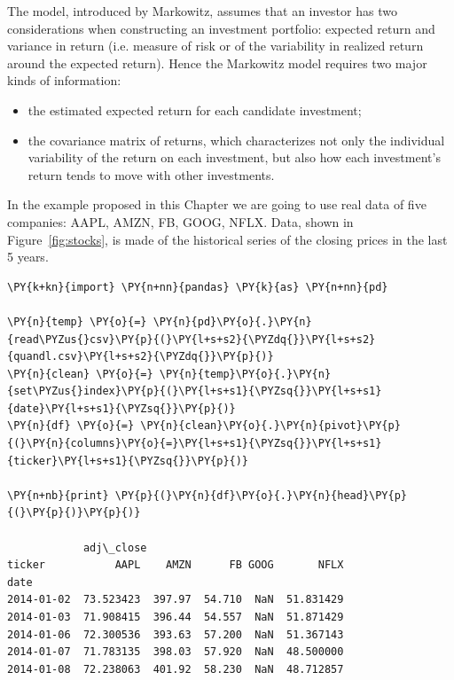 The model, introduced by Markowitz, assumes that an investor has
two considerations when constructing an investment portfolio: expected
return and variance in return (i.e. measure of risk or of the
variability in realized return around the expected return). Hence the
Markowitz model requires two major kinds of information:

\begin{itemize}
\tightlist
\item
  the estimated expected return for each candidate investment;
\item
  the covariance matrix of returns, which characterizes not only the 
  individual variability of the return on each investment, but also how each investment's return tends to move with other investments.
\end{itemize}

In the example proposed in this Chapter we are going to use real data
of five companies:  AAPL, AMZN, FB, GOOG, NFLX.
Data, shown in Figure~\ref{fig:stocks}, is made of the historical 
series of the closing prices in the last 5 years.

\begin{tcolorbox}[breakable, size=fbox, boxrule=1pt, pad at break*=1mm,colback=cellbackground, colframe=cellborder]
\begin{Verbatim}[commandchars=\\\{\}]
\PY{k+kn}{import} \PY{n+nn}{pandas} \PY{k}{as} \PY{n+nn}{pd}

\PY{n}{temp} \PY{o}{=} \PY{n}{pd}\PY{o}{.}\PY{n}{read\PYZus{}csv}\PY{p}{(}\PY{l+s+s2}{\PYZdq{}}\PY{l+s+s2}{quandl.csv}\PY{l+s+s2}{\PYZdq{}}\PY{p}{)}
\PY{n}{clean} \PY{o}{=} \PY{n}{temp}\PY{o}{.}\PY{n}{set\PYZus{}index}\PY{p}{(}\PY{l+s+s1}{\PYZsq{}}\PY{l+s+s1}{date}\PY{l+s+s1}{\PYZsq{}}\PY{p}{)}
\PY{n}{df} \PY{o}{=} \PY{n}{clean}\PY{o}{.}\PY{n}{pivot}\PY{p}{(}\PY{n}{columns}\PY{o}{=}\PY{l+s+s1}{\PYZsq{}}\PY{l+s+s1}{ticker}\PY{l+s+s1}{\PYZsq{}}\PY{p}{)}

\PY{n+nb}{print} \PY{p}{(}\PY{n}{df}\PY{o}{.}\PY{n}{head}\PY{p}{(}\PY{p}{)}\PY{p}{)}

            adj\_close
ticker           AAPL    AMZN      FB GOOG       NFLX
date
2014-01-02  73.523423  397.97  54.710  NaN  51.831429
2014-01-03  71.908415  396.44  54.557  NaN  51.871429
2014-01-06  72.300536  393.63  57.200  NaN  51.367143
2014-01-07  71.783135  398.03  57.920  NaN  48.500000
2014-01-08  72.238063  401.92  58.230  NaN  48.712857
\end{Verbatim}
\end{tcolorbox}

